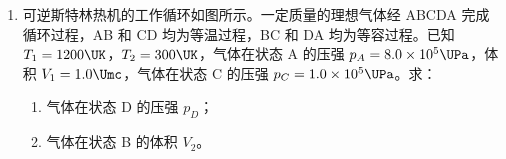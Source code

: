 \documentclass[\gkver]{gaokaozhenti}
\begin{document}
\begin{enumerate}
{（4）根据电阻定律 $R_{x} = \rho\frac{l}{dh} = \frac{\rho}{dh}\cdot l$，故可得 $k = \frac{\rho}{dh}$，得 $\rho = kdh$

电阻率越小更容易导电，根据图像可知 $65^{\circ}$C 的水的电阻率更小，故可知温度高的水更容易导电。

（5）根据前面分析可知 $65^{\circ}$C 的水的电阻率为
$\rho = kdh = \frac{8\times10^{3}}{0.7}\times0.07\times0.03 \UOm = 24 \UOm$

故当选用内直径为 $d_{0} = 8.0 \times 10^{-3} \Um$ 的水管。若人体的安全电流为 $I_{0} = 1.0 \times 10^{-3} \UA$，接入电压 $U = 220 \UV$ 时，得
$\frac{U}{R} = I_{0}$，$R = \rho\frac{l_{m}}{\pi\left(\frac{d_{0}}{2}\right)^{2}}$

解得水管的长度至少应设计为 $l_{m} = 0.46 \Um$
}

\item
可逆斯特林热机的工作循环如图所示。一定质量的理想气体经 ABCDA 完成循环过程，AB 和 CD 均为等温过程，BC 和 DA 均为等容过程。已知 $T_{1} = 1200 \UK$，$T_{2} = 300 \UK$，气体在状态 A 的压强 $p_{A} = 8.0\times10^{5} \UPa$，体积 $V_{1} = 1.0 \Umc$，气体在状态 C 的压强 $p_{C} = 1.0\times10^{5} \UPa$。求：
\begin{enumerate}
	\item
	气体在状态 D 的压强 $p_{D}$；
	\item
	气体在状态 B 的体积 $V_{2}$。
\end{enumerate}


\end{enumerate}
\end{document}
